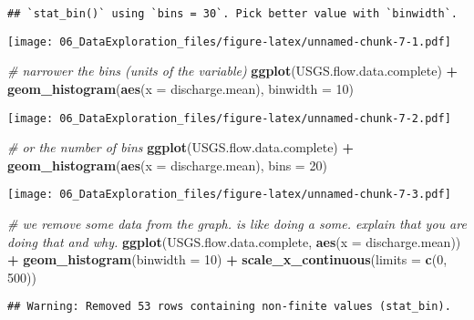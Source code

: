 \documentclass[]{article}
\newenvironment{Shaded}{\begin{snugshade}}{\end{snugshade}}
\newcommand{\KeywordTok}[1]{\textcolor[rgb]{0.13,0.29,0.53}{\textbf{#1}}}
\newcommand{\DataTypeTok}[1]{\textcolor[rgb]{0.13,0.29,0.53}{#1}}
\newcommand{\DecValTok}[1]{\textcolor[rgb]{0.00,0.00,0.81}{#1}}
\newcommand{\StringTok}[1]{\textcolor[rgb]{0.31,0.60,0.02}{#1}}
\newcommand{\CommentTok}[1]{\textcolor[rgb]{0.56,0.35,0.01}{\textit{#1}}}
\newcommand{\OperatorTok}[1]{\textcolor[rgb]{0.81,0.36,0.00}{\textbf{#1}}}
\newcommand{\NormalTok}[1]{#1}
\begin{document}
\begin{verbatim}
## `stat_bin()` using `bins = 30`. Pick better value with `binwidth`.
\end{verbatim}

\texttt{[image: 06\_DataExploration\_files/figure-latex/unnamed-chunk-7-1.pdf]}

\begin{Shaded}
\begin{Highlighting}[]
\CommentTok{# narrower the bins (units of the variable)}
\KeywordTok{ggplot}\NormalTok{(USGS.flow.data.complete) }\OperatorTok{+}
\StringTok{  }\KeywordTok{geom_histogram}\NormalTok{(}\KeywordTok{aes}\NormalTok{(}\DataTypeTok{x =}\NormalTok{ discharge.mean), }\DataTypeTok{binwidth =} \DecValTok{10}\NormalTok{)}
\end{Highlighting}
\end{Shaded}

\texttt{[image: 06\_DataExploration\_files/figure-latex/unnamed-chunk-7-2.pdf]}

\begin{Shaded}
\begin{Highlighting}[]
\CommentTok{# or the number of bins}
\KeywordTok{ggplot}\NormalTok{(USGS.flow.data.complete) }\OperatorTok{+}
\StringTok{  }\KeywordTok{geom_histogram}\NormalTok{(}\KeywordTok{aes}\NormalTok{(}\DataTypeTok{x =}\NormalTok{ discharge.mean), }\DataTypeTok{bins =} \DecValTok{20}\NormalTok{)}
\end{Highlighting}
\end{Shaded}

\texttt{[image: 06\_DataExploration\_files/figure-latex/unnamed-chunk-7-3.pdf]}

\begin{Shaded}
\begin{Highlighting}[]
\CommentTok{# we remove some data from the graph. is like doing a some. explain that you are doing that and why.}
\KeywordTok{ggplot}\NormalTok{(USGS.flow.data.complete, }\KeywordTok{aes}\NormalTok{(}\DataTypeTok{x =}\NormalTok{ discharge.mean)) }\OperatorTok{+}
\StringTok{  }\KeywordTok{geom_histogram}\NormalTok{(}\DataTypeTok{binwidth =} \DecValTok{10}\NormalTok{) }\OperatorTok{+}\StringTok{ }
\StringTok{  }\KeywordTok{scale_x_continuous}\NormalTok{(}\DataTypeTok{limits =} \KeywordTok{c}\NormalTok{(}\DecValTok{0}\NormalTok{, }\DecValTok{500}\NormalTok{))}
\end{Highlighting}
\end{Shaded}

\begin{verbatim}
## Warning: Removed 53 rows containing non-finite values (stat_bin).
\end{verbatim}
\end{document}
